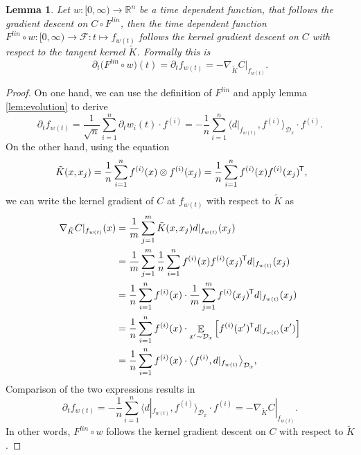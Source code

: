 \documentclass[11pt, a4paper]{article}
\newtheorem{lemma}[theorem]{Lemma}
\newcommand{\R}{\mathbb{R}}
\newcommand{\D}{\mathcal{D}}
\newcommand{\F}{\mathcal{F}}
\newcommand*{\tr}{^{\mkern-1.5mu\mathsf{T}}}
\DeclareMathOperator*{\E}{\mathbb{E}}
\begin{document}
\begin{lemma} \label{lem:tk}
Let $w: [0, \infty) \to \R^n$ be a time dependent function, that follows the gradient descent on $C \circ F^\textit{lin}$, then the time dependent function $F^\textit{lin} \circ w : [0, \infty) \to \F : t \mapsto f_{w(t)}$ follows the kernel gradient descent on $C$ with respect to the tangent kernel $\tilde{K}$. Formally this is
\[ \partial_t \big (F^\textit{lin} \circ w \big )(t) = \partial_tf_{w(t)} = -\nabla_{\tilde{K}}C|_{f_{w(t)}}. \]
\end{lemma}

\begin{proof}
On one hand, we can use the definition of $F^\textit{lin}$ and apply lemma \ref{lem:evolution} to derive
\[ \partial_tf_{w(t)} = \frac{1}{\sqrt{n}} \sum_{i=1}^{n} \partial_t w_i(t) \cdot f^{(i)} = - \frac{1}{n} \sum_{i=1}^{n} \big \langle d|_{f_{w(t)}}, f^{(i)} \big \rangle_{\D_x} \cdot f^{(i)}. \]
On the other hand, using the equation
\[ \tilde{K}(x,x_j) = \frac{1}{n} \sum_{i=1}^{n}f^{(i)}(x) \otimes f^{(i)}(x_j) = \frac{1}{n} \sum_{i=1}^{n}f^{(i)}(x) f^{(i)}(x_j) \tr, \]
we can write the kernel gradient of $C$ at $f_{w(t)}$ with respect to $\tilde{K}$ as
\[ \begin{split}
\nabla_{\tilde{K}} C|_{f_{w(t)}}(x)
&= \frac{1}{m} \sum_{j=1}^{m} \tilde{K}(x,x_j)d|_{f_{w(t)}}(x_j) \\\
&= \frac{1}{m} \sum_{j=1}^{m} \frac{1}{n} \sum_{i=1}^{n}f^{(i)}(x) f^{(i)}(x_j) \tr d|_{f_{w(t)}}(x_j) \\\
&= \frac{1}{n} \sum_{i=1}^{n} f^{(i)}(x) \cdot \frac{1}{m} \sum_{j=1}^{m} f^{(i)}(x_j) \tr  d|_{f_{w(t)}}(x_j) \\\
&= \frac{1}{n} \sum_{i=1}^{n} f^{(i)}(x) \cdot \E_{x' \sim \D_x} \Big [ f^{(i)}(x')\tr  d|_{f_{w(t)}}(x') \Big ] \\\
&= \frac{1}{n} \sum_{i=1}^{n} f^{(i)}(x) \cdot \big \langle f^{(i)}, d|_{f_{w(t)}} \big \rangle_{\D_x},
\end{split} \]
Comparison of the two expressions results in
\[ \partial_tf_{w(t)} = - \frac{1}{n} \sum_{i=1}^{n} \big \langle d|_{f_{w(t)}}, f^{(i)} \big \rangle_{\D_x} \cdot f^{(i)} = -\nabla_{\tilde{K}} C|_{f_{w(t)}}. \]
In other words, $F^\textit{lin} \circ w$ follows the kernel gradient descent on $C$ with respect to $\tilde{K}$.
\end{proof}
\end{document}
